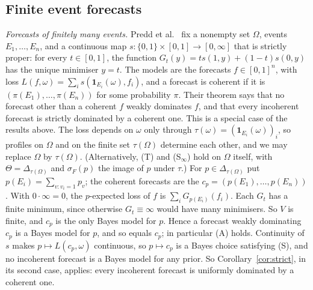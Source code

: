 \documentclass[11pt]{article}
\theoremstyle{definition}
\theoremstyle{remark}
\newcommand{\one}{\mathbf 1}
\begin{document}
\subsection{Finite event forecasts}\label{sec:forecasts}
\emph{Forecasts of finitely many events.} Predd et al.~\cite[Theorem~1]{Predd} fix a nonempty set $\Omega$, events $E_1,\dots,E_n$, and a continuous map $s:\{0,1\}\times[0,1]\to[0,\infty]$ that is strictly proper: for every $t\in[0,1]$, the function $G_t(y)=ts(1,y)+(1-t)s(0,y)$ has the unique minimiser $y=t$. The models are the forecasts $f\in[0,1]^n$, with loss $L(f,\omega)=\sum_is(\one_{E_i}(\omega),f_i)$, and a forecast is coherent if it is $(\pi(E_1),\dots,\pi(E_n))$ for some probability $\pi$. Their theorem says that no forecast other than a coherent $f$ weakly dominates $f$, and that every incoherent forecast is strictly dominated by a coherent one. This is a special case of the results above. The loss depends on $\omega$ only through $\tau(\omega)=(\one_{E_i}(\omega))_i$, so profiles on $\Omega$ and on the finite set $\tau(\Omega)$ determine each other, and we may replace $\Omega$ by $\tau(\Omega)$. (Alternatively, (T) and (S$_\infty$) hold on $\Omega$ itself, with $\Theta=\Delta_{\tau(\Omega)}$ and $\sigma_F(p)$ the image of $p$ under $\tau$.) For $p\in\Delta_{\tau(\Omega)}$ put $p(E_i)=\sum_{v:v_i=1}p_v$; the coherent forecasts are the $c_p=(p(E_1),\dots,p(E_n))$. With $0\cdot\infty=0$, the $p$-expected loss of $f$ is $\sum_iG_{p(E_i)}(f_i)$. Each $G_t$ has a finite minimum, since otherwise $G_t\equiv\infty$ would have many minimisers. So $V$ is finite, and $c_p$ is the only Bayes model for $p$. Hence a forecast weakly dominating $c_p$ is a Bayes model for $p$, and so equals $c_p$; in particular (A) holds. Continuity of $s$ makes $p\mapsto L(c_p,\omega)$ continuous, so $p\mapsto c_p$ is a Bayes choice satisfying (S), and no incoherent forecast is a Bayes model for any prior. So Corollary~\ref{cor:strict}, in its second case, applies: every incoherent forecast is uniformly dominated by a coherent one.
\end{document}
